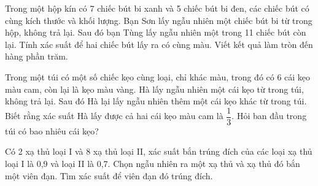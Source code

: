 \begin{ex}%
    Trong một hộp kín có 7 chiếc bút bi xanh và 5 chiếc bút bi đen, các chiếc bút có cùng kích thước và khối lượng. Bạn Sơn lấy ngẫu nhiên một chiếc bút bi từ trong hộp, không trả lại. Sau đó bạn Tùng lấy ngẫu nhiên một trong 11 chiếc bút còn lại. Tính xác suất để hai chiếc bút lấy ra có cùng màu. Viết kết quả làm tròn đến hàng phần trăm.
\end{ex}
\begin{ex}%
    Trong một túi có một số chiếc kẹo cùng loại, chỉ khác màu, trong đó có 6 cái kẹo màu cam, còn lại là kẹo màu vàng. Hà lấy ngẫu nhiên một cái kẹo từ trong túi, không trả lại. Sau đó Hà lại lấy ngẫu nhiên thêm một cái kẹo khác từ trong túi. Biết rằng xác suất Hà lấy được cả hai cái kẹo màu cam là $\dfrac{1}{3}$. Hỏi ban đầu trong túi có bao nhiêu cái kẹo?
\end{ex}
\begin{ex}%
    Có 2 xạ thủ loại I và 8 xạ thủ loại II, xác suất bắn trúng đích của các loại xạ thủ loại I là 0,9 và loại II là 0,7. Chọn ngẫu nhiên ra một xạ thủ và xạ thủ đó bắn một viên đạn. Tìm xác suất để viên đạn đó trúng đích.
\end{ex}
